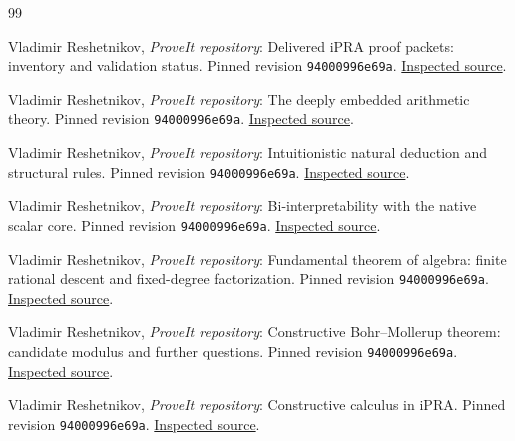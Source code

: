 \begin{thebibliography}{99}

 Vladimir Reshetnikov, \emph{ProveIt repository}: Delivered iPRA proof packets: inventory and validation status. Pinned revision \texttt{94000996e69a}. \href{https://github.com/VladimirReshetnikov/ProveIt/blob/94000996e69ab0c527393a1d02a4a037a4eb0493/Logic/PrimitiveRecursiveArithmetic/docs/proofs/README.md}{Inspected source}.

 Vladimir Reshetnikov, \emph{ProveIt repository}: The deeply embedded arithmetic theory. Pinned revision \texttt{94000996e69a}. \href{https://github.com/VladimirReshetnikov/ProveIt/blob/94000996e69ab0c527393a1d02a4a037a4eb0493/Logic/PrimitiveRecursiveArithmetic/ConciseIPRA/Lean/ConciseIPRA/PR.lean}{Inspected source}.

 Vladimir Reshetnikov, \emph{ProveIt repository}: Intuitionistic natural deduction and structural rules. Pinned revision \texttt{94000996e69a}. \href{https://github.com/VladimirReshetnikov/ProveIt/blob/94000996e69ab0c527393a1d02a4a037a4eb0493/Logic/PrimitiveRecursiveArithmetic/ConciseIPRA/Lean/ConciseIPRA/Deduction.lean}{Inspected source}.

 Vladimir Reshetnikov, \emph{ProveIt repository}: Bi-interpretability with the native scalar core. Pinned revision \texttt{94000996e69a}. \href{https://github.com/VladimirReshetnikov/ProveIt/blob/94000996e69ab0c527393a1d02a4a037a4eb0493/Logic/PrimitiveRecursiveArithmetic/ConciseIPRA/Lean/ConciseIPRA/NativeBiInterpretation.lean}{Inspected source}.

 Vladimir Reshetnikov, \emph{ProveIt repository}: Fundamental theorem of algebra: finite rational descent and fixed-degree factorization. Pinned revision \texttt{94000996e69a}. \href{https://github.com/VladimirReshetnikov/ProveIt/blob/94000996e69ab0c527393a1d02a4a037a4eb0493/Logic/PrimitiveRecursiveArithmetic/docs/proofs/algebra/FTA_iPRA/FTA_iPRA.tex}{Inspected source}.

 Vladimir Reshetnikov, \emph{ProveIt repository}: Constructive Bohr--Mollerup theorem: candidate modulus and further questions. Pinned revision \texttt{94000996e69a}. \href{https://github.com/VladimirReshetnikov/ProveIt/blob/94000996e69ab0c527393a1d02a4a037a4eb0493/Logic/PrimitiveRecursiveArithmetic/docs/proofs/analysis/bohr_mollerup_ipra_2026-11-15/paper/bohr_mollerup_ipra.tex}{Inspected source}.

 Vladimir Reshetnikov, \emph{ProveIt repository}: Constructive calculus in iPRA. Pinned revision \texttt{94000996e69a}. \href{https://github.com/VladimirReshetnikov/ProveIt/blob/94000996e69ab0c527393a1d02a4a037a4eb0493/Logic/PrimitiveRecursiveArithmetic/docs/proofs/analysis/calculus_ipra/report.tex}{Inspected source}.


\end{thebibliography}
